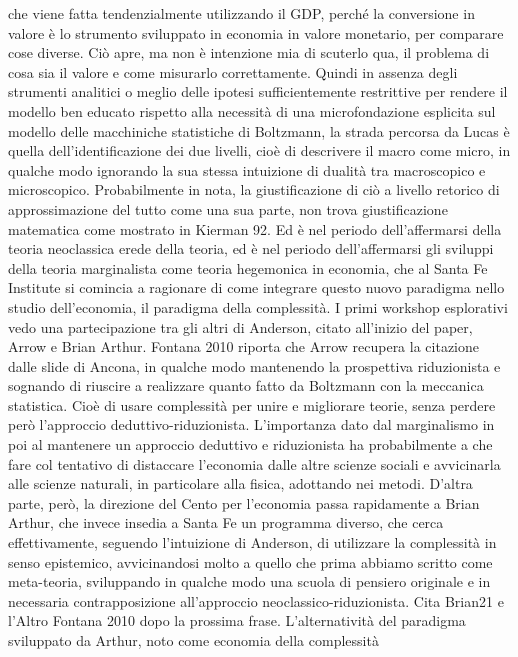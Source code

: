 \documentclass[a4paper, headings=standardclasses]{scrartcl}
\begin{document}
che viene fatta tendenzialmente utilizzando il GDP, perché la conversione in valore è
lo strumento sviluppato in economia in valore monetario, per comparare cose diverse. Ciò
apre, ma non è intenzione mia di scuterlo qua, il problema di cosa sia il valore e come
misurarlo correttamente. Quindi in assenza degli strumenti analitici o meglio delle ipotesi
sufficientemente restrittive per rendere il modello ben educato rispetto alla necessità
di una microfondazione esplicita sul modello delle macchiniche statistiche di Boltzmann,
la strada percorsa da Lucas è quella dell'identificazione dei due livelli, cioè di descrivere il macro
come micro, in qualche modo ignorando la sua stessa intuizione di dualità tra macroscopico
e microscopico. Probabilmente in nota, la giustificazione di ciò a livello retorico
di approssimazione del tutto come una sua parte, non trova giustificazione matematica
come mostrato in Kierman 92. Ed è nel periodo dell'affermarsi della teoria neoclassica
erede della teoria, ed è nel periodo dell'affermarsi gli sviluppi della teoria marginalista come
teoria hegemonica in economia, che al Santa Fe Institute si comincia a ragionare di come
integrare questo nuovo paradigma nello studio dell'economia, il paradigma della complessità.
I primi workshop esplorativi vedo una partecipazione tra gli altri di Anderson, citato all'inizio
del paper, Arrow e Brian Arthur. Fontana 2010 riporta che Arrow recupera la citazione
dalle slide di Ancona, in qualche modo mantenendo la prospettiva riduzionista e sognando di riuscire
a realizzare quanto fatto da Boltzmann con la meccanica statistica. Cioè di usare
complessità per unire e migliorare teorie, senza perdere però l'approccio deduttivo-riduzionista.
L'importanza dato dal marginalismo in poi al mantenere un approccio deduttivo e riduzionista
ha probabilmente a che fare col tentativo di distaccare l'economia dalle altre scienze
sociali e avvicinarla alle scienze naturali, in particolare alla fisica, adottando nei metodi.
D'altra parte, però, la direzione del Cento per l'economia passa rapidamente a Brian Arthur,
che invece insedia a Santa Fe un programma diverso, che cerca effettivamente, seguendo
l'intuizione di Anderson, di utilizzare la complessità in senso epistemico, avvicinandosi
molto a quello che prima abbiamo scritto come meta-teoria, sviluppando in qualche modo una
scuola di pensiero originale e in necessaria contrapposizione all'approccio neoclassico-riduzionista.
Cita Brian21 e l'Altro Fontana 2010 dopo la prossima frase.
L'alternatività del paradigma sviluppato da Arthur, noto come economia della complessità
\end{document}
